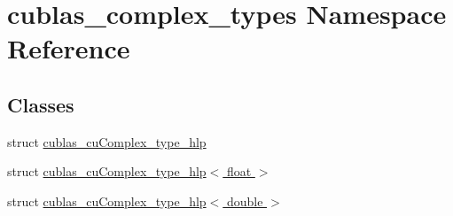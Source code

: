 \hypertarget{namespacecublas__complex__types}{\section{cublas\-\_\-complex\-\_\-types Namespace Reference}
\label{namespacecublas__complex__types}
}
\subsection*{Classes}
\begin{DoxyCompactItemize}
\item 
struct \hyperlink{structcublas__complex__types_1_1cublas__cuComplex__type__hlp}{cublas\-\_\-cu\-Complex\-\_\-type\-\_\-hlp}
\item 
struct \hyperlink{structcublas__complex__types_1_1cublas__cuComplex__type__hlp_3_01float_01_4}{cublas\-\_\-cu\-Complex\-\_\-type\-\_\-hlp$<$ float $>$}
\item 
struct \hyperlink{structcublas__complex__types_1_1cublas__cuComplex__type__hlp_3_01double_01_4}{cublas\-\_\-cu\-Complex\-\_\-type\-\_\-hlp$<$ double $>$}
\end{DoxyCompactItemize}
